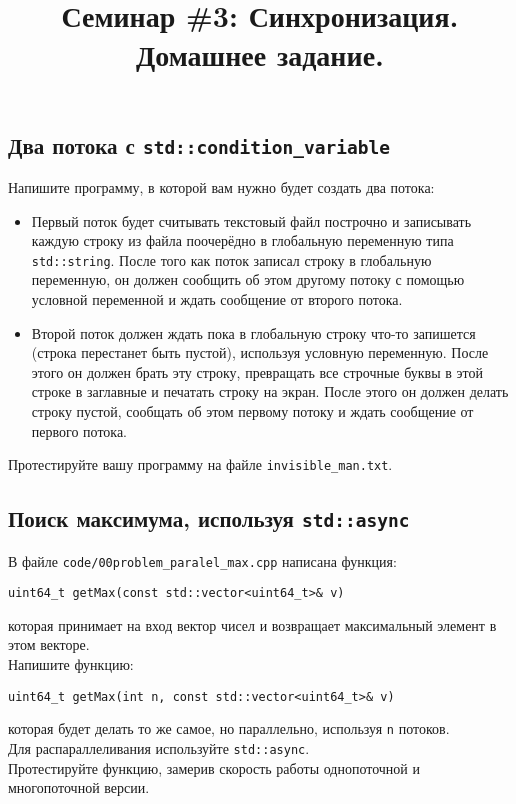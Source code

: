 \documentclass{article}
\begin{document}
\title{Семинар \#3: Синхронизация. Домашнее задание.\vspace{-5ex}}\date{}\maketitle

\subsection{Два потока с \texttt{std::condition\_variable}}
Напишите программу, в которой вам нужно будет создать два потока:

\begin{itemize}
\item Первый поток будет считывать текстовый файл построчно и записывать каждую строку из файла поочерёдно в глобальную переменную типа \texttt{std::string}. После того как поток записал строку в глобальную переменную, он должен сообщить об этом другому потоку с помощью условной переменной и ждать сообщение от второго потока.

\item Второй поток должен ждать пока в глобальную строку что-то запишется (строка перестанет быть пустой), используя условную переменную. После этого он должен брать эту строку, превращать все строчные буквы в этой строке в заглавные и печатать строку на экран. После этого он должен делать строку пустой, сообщать об этом первому потоку и ждать сообщение от первого потока.
\end{itemize}
Протестируйте вашу программу на файле \texttt{invisible\_man.txt}.

\subsection{Поиск максимума, используя \texttt{std::async}}
В файле \texttt{code/00problem\_paralel\_max.cpp} написана функция:
\begin{lstlisting}
uint64_t getMax(const std::vector<uint64_t>& v)
\end{lstlisting}
которая принимает на вход вектор чисел и возвращает максимальный элемент в этом векторе.\\
Напишите функцию:
\begin{lstlisting}
uint64_t getMax(int n, const std::vector<uint64_t>& v)
\end{lstlisting}
которая будет делать то же самое, но параллельно, используя \texttt{n} потоков.\\
Для распараллеливания используйте \texttt{std::async}.\\
Протестируйте функцию, замерив скорость работы однопоточной и многопоточной версии.
\end{document}
